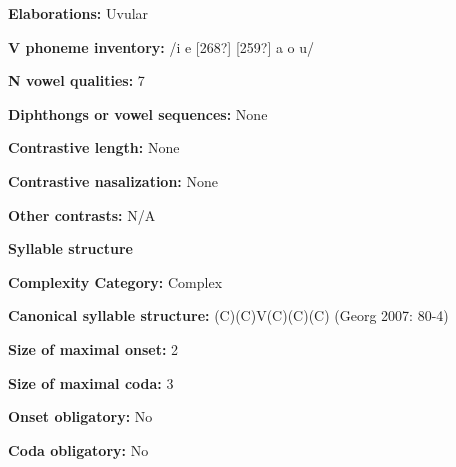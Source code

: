 \begin{styleBody}
\textbf{Elaborations:} Uvular
\end{styleBody}

\begin{styleBody}
\textbf{V phoneme inventory:} /i e [268?] [259?] a o u/
\end{styleBody}

\begin{styleBody}
\textbf{N vowel qualities:} 7
\end{styleBody}

\begin{styleBody}
\textbf{Diphthongs or vowel sequences:} None
\end{styleBody}

\begin{styleBody}
\textbf{Contrastive length:} None
\end{styleBody}

\begin{styleBody}
\textbf{Contrastive nasalization:} None
\end{styleBody}

\begin{styleBody}
\textbf{Other contrasts:} N/A
\end{styleBody}

\begin{styleBody}
\textbf{Syllable structure}
\end{styleBody}

\begin{styleBody}
\textbf{Complexity Category:} Complex
\end{styleBody}

\begin{styleBody}
\textbf{Canonical syllable structure:} (C)(C)V(C)(C)(C)\textbf{ }(Georg 2007: 80-4)
\end{styleBody}

\begin{styleBody}
\textbf{Size of maximal onset:} 2
\end{styleBody}

\begin{styleBody}
\textbf{Size of maximal coda:} 3
\end{styleBody}

\begin{styleBody}
\textbf{Onset obligatory:} No
\end{styleBody}

\begin{styleBody}
\textbf{Coda obligatory:} No
\end{styleBody}

